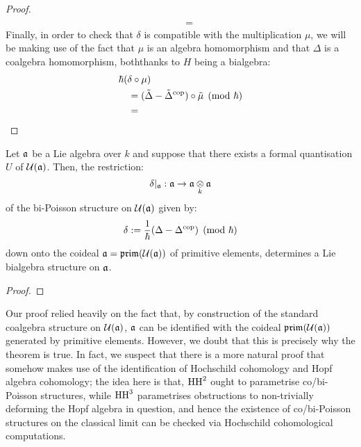 \begin{proof}
$$\begin{aligned}
                            \\
                            & \quad = 
                        \end{aligned}
                    $$
                Finally, in order to check that $\delta$ is compatible with the multiplication $\mu$, we will be making use of the fact that $\mu$ is an algebra homomorphism and that $\Delta$ is a coalgebra homomorphism, boththanks to $H$ being a bialgebra:
                    $$
                        \begin{aligned}
                            & \hbar( \delta \circ \mu )
                            \\
                            & \quad = (\tilde{\Delta} - \tilde{\Delta}^{\mathrm{cop}}) \circ \tilde{\mu} \pmod{\hbar}
                            \\
                            & \quad = 
                        \end{aligned}
                    $$
            \end{proof}
        \begin{theorem} \label{theorem: lie_bialgebra_structures_from_bi_poisson_structures}
            Let $\mathfrak{a}$ be a Lie algebra over $k$ and suppose that there exists a formal quantisation $U$ of $\mathcal{U}(\mathfrak{a})$. Then, the restriction:
                $$\delta|_{\a}: \a \to \a \tensor_k \a$$
            of the bi-Poisson structure on $\mathcal{U}(\mathfrak{a})$ given by:
                $$\delta := \frac{1}{\hbar}(\Delta - \Delta^{\mathrm{cop}}) \pmod{\hbar}$$
            down onto the coideal $\mathfrak{a} = \mathfrak{prim}(\mathcal{U}(\mathfrak{a}))$ of primitive elements, determines a Lie bialgebra structure on $\mathfrak{a}$.    
        \end{theorem}
            \begin{proof}
                
            \end{proof}
        \begin{remark}
            Our proof relied heavily on the fact that, by construction of the standard coalgebra structure on $\mathcal{U}(\mathfrak{a})$, $\mathfrak{a}$ can be identified with the coideal $\mathfrak{prim}(\mathcal{U}(\mathfrak{a}))$ generated by primitive elements. However, we doubt that this is precisely why the theorem is true. In fact, we suspect that there is a more natural proof that somehow makes use of the identification of Hochschild cohomology and Hopf algebra cohomology; the idea here is that, $\mathrm{HH}^2$ ought to parametrise co/bi-Poisson structures, while $\mathrm{HH}^3$ parametrises obstructions to non-trivially deforming the Hopf algebra in question, and hence the existence of co/bi-Poisson structures on the classical limit can be checked via Hochschild cohomological computations. 
        \end{remark}
    
